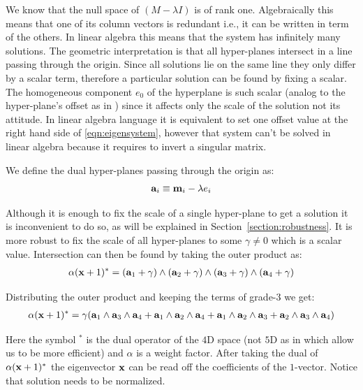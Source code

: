 \documentclass{birkjour}
\numberwithin{equation}{section}
\begin{document}
We know that the null space of $(M - \lambda I)$ is of rank one. Algebraically this means that one of its column vectors is redundant i.e., it can be written in term of the others. In linear algebra this means that the system has infinitely many solutions. The geometric interpretation is that all hyper-planes intersect in a line passing through the origin. Since all solutions lie on the same line they only differ by a scalar term, therefore a particular solution can be found by fixing a scalar. The homogeneous component $e_0$ of the hyperplane is such scalar (analog to the hyper-plane's offset as in \cite{DeKeninck2019}) since it affects only the scale of the solution not its attitude. In linear algebra language it is equivalent to set one offset value at the right hand side of \ref{eqn:eigensystem}, however that system can't be solved in linear algebra because it requires to invert a singular matrix.

We define the dual hyper-planes passing through the origin as:
\begin{eqnarray}
   \textbf a_i \equiv \textbf m_i - \lambda e_i
\end{eqnarray}

Although it is enough to fix the scale of a single hyper-plane to get a solution it is inconvenient to do so, as will be explained in Section~\ref{section:robustness}. It is more robust to fix the scale of all hyper-planes to some $\gamma \neq 0$ which is a scalar value. Intersection can then be found by taking the outer product as:
\begin{eqnarray}
\label{eqn:hyperplanes_intersection}
\alpha (\textbf x + 1)^* = (\textbf a_1 + \gamma) \wedge  (\textbf a_2 + \gamma) \wedge  (\textbf a_3  + \gamma) \wedge (\textbf a_4 + \gamma)
\end{eqnarray}

Distributing the outer product and keeping the terms of grade-$3$ we get:
\begin{eqnarray}
\alpha (\textbf x + 1)^* =  \gamma (\textbf a_1 \wedge \textbf a_3 \wedge \textbf a_4
+ \textbf a_1 \wedge \textbf a_2 \wedge \textbf a_4
+ \textbf a_1 \wedge \textbf a_2 \wedge \textbf a_3
+ \textbf a_2 \wedge \textbf a_3 \wedge \textbf a_4)
\end{eqnarray}

Here the symbol $^*$ is the dual operator of the $4$D space (not $5$D as in \cite{DeKeninck2019} which allow us to be more efficient) and $\alpha$ is a weight factor. After taking the dual of $\alpha (\textbf x + 1)^*$ the eigenvector $\textbf x$ can be read off the coefficients of the $1$-vector. Notice that solution needs to be normalized.
\end{document}
